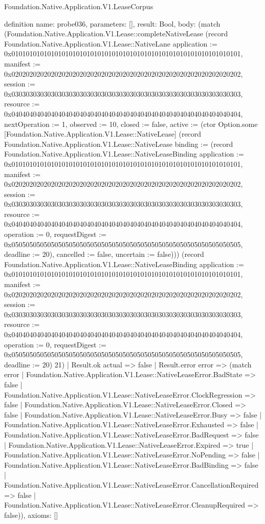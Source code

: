 \begin{lexlean}{Foundation.Native.Application.V1.LeaseCorpus}
\begin{semanticmodule}
definition{
  name: probe036,
  parameters: [],
  result: Bool,
  body: (match (Foundation.Native.Application.V1.Lease::completeNativeLease (record Foundation.Native.Application.V1.Lease::NativeLane {application := 0x0101010101010101010101010101010101010101010101010101010101010101, manifest := 0x0202020202020202020202020202020202020202020202020202020202020202, session := 0x0303030303030303030303030303030303030303030303030303030303030303, resource := 0x0404040404040404040404040404040404040404040404040404040404040404, nextOperation := 1, observed := 10, closed := false, active := (ctor Option.some [Foundation.Native.Application.V1.Lease::NativeLease] (record Foundation.Native.Application.V1.Lease::NativeLease {binding := (record Foundation.Native.Application.V1.Lease::NativeLeaseBinding {application := 0x0101010101010101010101010101010101010101010101010101010101010101, manifest := 0x0202020202020202020202020202020202020202020202020202020202020202, session := 0x0303030303030303030303030303030303030303030303030303030303030303, resource := 0x0404040404040404040404040404040404040404040404040404040404040404, operation := 0, requestDigest := 0x0505050505050505050505050505050505050505050505050505050505050505, deadline := 20}), cancelled := false, uncertain := false}))}) (record Foundation.Native.Application.V1.Lease::NativeLeaseBinding {application := 0x0101010101010101010101010101010101010101010101010101010101010101, manifest := 0x0202020202020202020202020202020202020202020202020202020202020202, session := 0x0303030303030303030303030303030303030303030303030303030303030303, resource := 0x0404040404040404040404040404040404040404040404040404040404040404, operation := 0, requestDigest := 0x0505050505050505050505050505050505050505050505050505050505050505, deadline := 20}) 21)
    | Result.ok actual => false
    | Result.error error => (match error
      | Foundation.Native.Application.V1.Lease::NativeLeaseError.BadState => false
      | Foundation.Native.Application.V1.Lease::NativeLeaseError.ClockRegression => false
      | Foundation.Native.Application.V1.Lease::NativeLeaseError.Closed => false
      | Foundation.Native.Application.V1.Lease::NativeLeaseError.Busy => false
      | Foundation.Native.Application.V1.Lease::NativeLeaseError.Exhausted => false
      | Foundation.Native.Application.V1.Lease::NativeLeaseError.BadRequest => false
      | Foundation.Native.Application.V1.Lease::NativeLeaseError.Expired => true
      | Foundation.Native.Application.V1.Lease::NativeLeaseError.NoPending => false
      | Foundation.Native.Application.V1.Lease::NativeLeaseError.BadBinding => false
      | Foundation.Native.Application.V1.Lease::NativeLeaseError.CancellationRequired => false
      | Foundation.Native.Application.V1.Lease::NativeLeaseError.CleanupRequired => false)),
  axioms: []
}


\end{semanticmodule}
\end{lexlean}
